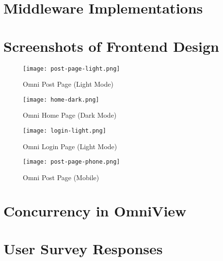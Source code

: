 \appendix
\label{sec:appendix}

\chapter{Middleware Implementations}
\label{sec:apdx-middleware-implementations}





\chapter{Screenshots of Frontend Design}
\label{sec:apdx-screenshots}

\begin{figure}[htbp]
\texttt{[image: post-page-light.png]}
\centering
\caption{Omni Post Page (Light Mode)}
\end{figure}

\begin{figure}[t]
\texttt{[image: home-dark.png]}
\centering
\caption{Omni Home Page (Dark Mode)}
\end{figure}

\begin{figure}[b]
\texttt{[image: login-light.png]}
\centering
\caption{Omni Login Page (Light Mode)}
\end{figure}

\begin{figure}[htbp]
\texttt{[image: post-page-phone.png]}
\centering
\caption{Omni Post Page (Mobile)}
\end{figure}

\chapter{Concurrency in OmniView}
\label{sec:apdx-concurrency-omni-view}



\chapter{User Survey Responses}
\label{sec:apdx-user-survey}
